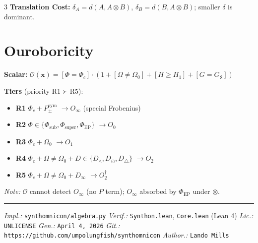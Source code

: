 \documentclass[8pt,a4paper,landscape]{article}
\begin{document}
\begin{multicols}{3}
\textbf{Translation Cost:} $\delta_A=d(A,A\otimes B)$, $\delta_B=d(B,A\otimes B)$; smaller $\delta$ is dominant.

\section*{Ouroboricity}
\footnotesize
\textbf{Scalar:} $\mathcal{O}(\mathbf{x})=[\Phi{=}\Phi_c]\cdot(1+[\Omega{\neq}\Omega_0]+[H{\ge}H_1]+[G{=}G_\aleph])$

\textbf{Tiers} (priority R1$\succ$R5):
\begin{itemize}[leftmargin=*,nosep,topsep=2pt,itemsep=1pt]
\item \textbf{R1} $\Phi_c+P_\pm^{\text{sym}}$ $\to O_\infty$ (special Frobenius)
\item \textbf{R2} $\Phi\in\{\Phi_{\text{sub}},\Phi_{\text{super}},\Phi_{\text{EP}}\}$ $\to O_0$
\item \textbf{R3} $\Phi_c+\Omega_0$ $\to O_1$
\item \textbf{R4} $\Phi_c+\Omega{\neq}\Omega_0+D\in\{D_\wedge,D_\odot,D_\triangle\}$ $\to O_2$
\item \textbf{R5} $\Phi_c+\Omega{\neq}\Omega_0+D_\infty$ $\to O_2^\dagger$
\end{itemize}
\textit{Note:} $\mathcal{O}$ cannot detect $O_\infty$ (no $P$ term); $O_\infty$ absorbed by $\Phi_{\text{EP}}$ under $\otimes$.

\end{multicols}

\vfill
\noindent\hrule
\vspace{0.1em}
\noindent\footnotesize
\textit{Impl.:} \texttt{synthomnicon/algebra.py} \quad
\textit{Verif.:} \texttt{Synthon.lean}, \texttt{Core.lean} (Lean 4) \quad
\textit{Lic.:} \texttt{UNLICENSE} \quad
\textit{Gen.:} \texttt{April 4, 2026} \quad
\textit{Git.:} \texttt{https://github.com/umpolungfish/synthomnicon} \quad
\textit{Author.:} \texttt{Lando Mills} \quad
\end{document}
